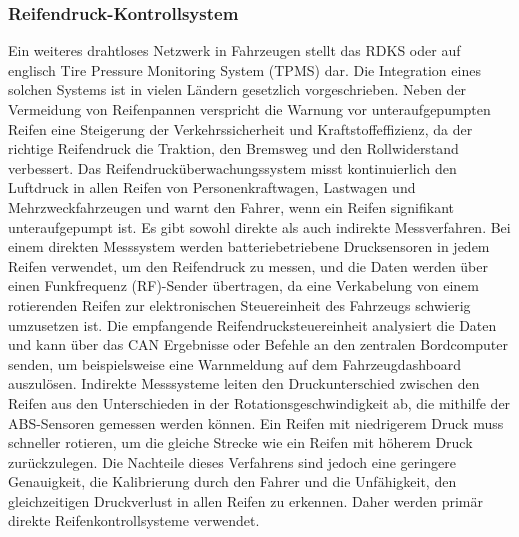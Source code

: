 \subsubsection{Reifendruck-Kontrollsystem}
Ein weiteres drahtloses Netzwerk in Fahrzeugen stellt das \ac{RDKS} oder auf englisch Tire Pressure Monitoring System (TPMS) dar. Die Integration eines solchen Systems ist in vielen Ländern gesetzlich vorgeschrieben. Neben der Vermeidung von Reifenpannen verspricht die Warnung vor unteraufgepumpten Reifen eine Steigerung der Verkehrssicherheit und Kraftstoffeffizienz, da der richtige Reifendruck die Traktion, den Bremsweg und den Rollwiderstand verbessert. Das Reifendrucküberwachungssystem misst kontinuierlich den Luftdruck in allen Reifen von Personenkraftwagen, Lastwagen und Mehrzweckfahrzeugen und warnt den Fahrer, wenn ein Reifen signifikant unteraufgepumpt ist. Es gibt sowohl direkte als auch indirekte Messverfahren. Bei einem direkten Messsystem werden batteriebetriebene Drucksensoren in jedem Reifen verwendet, um den Reifendruck zu messen, und die Daten werden über einen Funkfrequenz (RF)-Sender übertragen, da eine Verkabelung von einem rotierenden Reifen zur elektronischen Steuereinheit des Fahrzeugs schwierig umzusetzen ist. Die empfangende Reifendrucksteuereinheit analysiert die Daten und kann über das \ac{CAN} Ergebnisse oder Befehle an den zentralen Bordcomputer senden, um beispielsweise eine Warnmeldung auf dem Fahrzeugdashboard auszulösen. Indirekte Messsysteme leiten den Druckunterschied zwischen den Reifen aus den Unterschieden in der Rotationsgeschwindigkeit ab, die mithilfe der \ac{ABS}-Sensoren gemessen werden können. Ein Reifen mit niedrigerem Druck muss schneller rotieren, um die gleiche Strecke wie ein Reifen mit höherem Druck zurückzulegen. Die Nachteile dieses Verfahrens sind jedoch eine geringere Genauigkeit, die Kalibrierung durch den Fahrer und die Unfähigkeit, den gleichzeitigen Druckverlust in allen Reifen zu erkennen. Daher werden primär direkte Reifenkontrollsysteme verwendet. \cite[1]{Rouf.2010}

